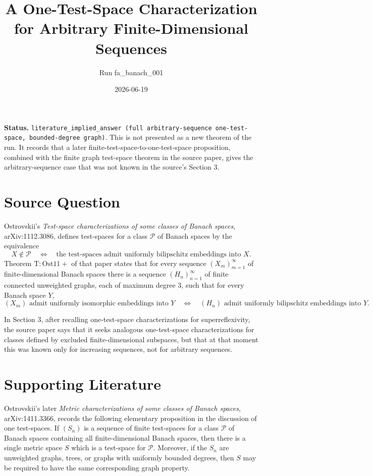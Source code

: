 \documentclass[11pt]{amsart}
\begin{document}
\title{A One-Test-Space Characterization for Arbitrary Finite-Dimensional Sequences}
\author{Run fa\_banach\_001}
\date{2026-06-19}
\maketitle

\noindent
\textbf{Status.} \texttt{literature\_implied\_answer (full arbitrary-sequence
one-test-space, bounded-degree graph)}. This is not presented as a new theorem
of the run. It records that a later finite-test-space-to-one-test-space
proposition, combined with the finite graph test-space theorem in the source
paper, gives the arbitrary-sequence case that was not known in the source's
Section 3.

\section*{Source Question}

Ostrovskii's \emph{Test-space characterizations of some classes of Banach
spaces}, arXiv:1112.3086, defines test-spaces for a class \(\mathcal P\) of
Banach spaces by the equivalence
\[
  X\notin \mathcal P
  \quad\Longleftrightarrow\quad
  \text{the test-spaces admit uniformly bilipschitz embeddings into } X.
\]
Theorem \(\mathrm{T:Ost11+}\) of that paper states that for every sequence
\((X_m)_{m=1}^{\infty}\) of finite-dimensional Banach spaces there is a
sequence \((H_n)_{n=1}^{\infty}\) of finite connected unweighted graphs, each
of maximum degree \(3\), such that for every Banach space \(Y\),
\[
  (X_m) \text{ admit uniformly isomorphic embeddings into } Y
  \quad\Longleftrightarrow\quad
  (H_n) \text{ admit uniformly bilipschitz embeddings into } Y.
\]

In Section 3, after recalling one-test-space characterizations for
superreflexivity, the source paper says that it seeks analogous
one-test-space characterizations for classes defined by excluded
finite-dimensional subspaces, but that at that moment this was known only for
increasing sequences, not for arbitrary sequences.

\section*{Supporting Literature}

Ostrovskii's later \emph{Metric characterizations of some classes of Banach
spaces}, arXiv:1411.3366, records the following elementary proposition in the
discussion of one test-spaces. If \((S_n)\) is a sequence of finite test-spaces
for a class \(\mathcal P\) of Banach spaces containing all finite-dimensional
Banach spaces, then there is a single metric space \(S\) which is a test-space
for \(\mathcal P\). Moreover, if the \(S_n\) are unweighted graphs, trees, or
graphs with uniformly bounded degrees, then \(S\) may be required to have the
same corresponding graph property.
\end{document}
